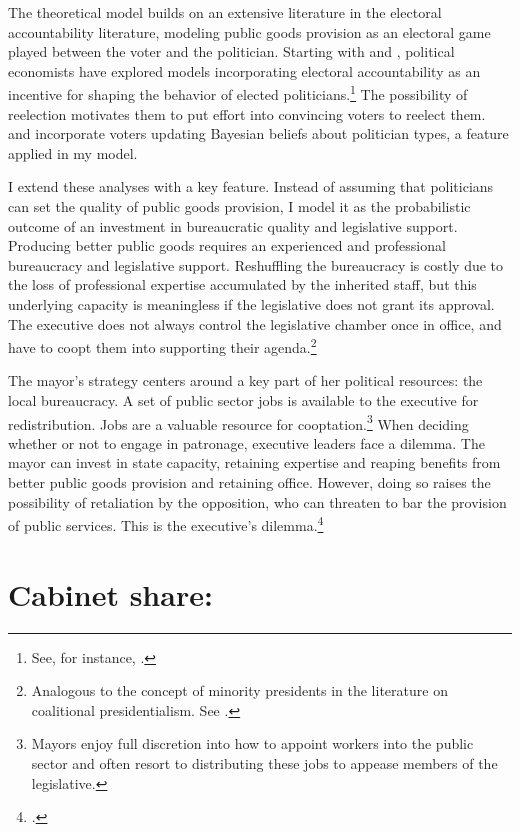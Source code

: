 \documentclass[12pt,]{book}
\let\rmarkdownfootnote\footnote%
\def\footnote{\protect\rmarkdownfootnote}
\begin{document}
The theoretical model builds on an extensive literature in the electoral accountability literature, modeling public goods provision as an electoral game played between the voter and the politician. Starting with \citet{barro_control_1973} and \citet{ferejohn_incumbent_1986}, political economists have explored models incorporating electoral accountability as an incentive for shaping the behavior of elected politicians.\footnote{See, for instance, \citet{ferraz_electoral_2011}.} The possibility of reelection motivates them to put effort into convincing voters to reelect them. \citet{coate_form_1995} and \citet{besley_principled_2006} incorporate voters updating Bayesian beliefs about politician types, a feature applied in my model.

I extend these analyses with a key feature. Instead of assuming that politicians can set the quality of public goods provision, I model it as the probabilistic outcome of an investment in bureaucratic quality and legislative support. Producing better public goods requires an experienced and professional bureaucracy and legislative support. Reshuffling the bureaucracy is costly due to the loss of professional expertise accumulated by the inherited staff, but this underlying capacity is meaningless if the legislative does not grant its approval. The executive does not always control the legislative chamber once in office, and have to coopt them into supporting their agenda.\footnote{Analogous to the concept of minority presidents in the literature on coalitional presidentialism. See \citet{figueiredo_presidential_2000}.}

The mayor's strategy centers around a key part of her political resources: the local bureaucracy. A set of public sector jobs is available to the executive for redistribution. Jobs are a valuable resource for cooptation.\footnote{Mayors enjoy full discretion into how to appoint workers into the public sector and often resort to distributing these jobs to appease members of the legislative.} When deciding whether or not to engage in patronage, executive leaders face a dilemma. The mayor can invest in state capacity, retaining expertise and reaping benefits from better public goods provision and retaining office. However, doing so raises the possibility of retaliation by the opposition, who can threaten to bar the provision of public services. This is the executive's dilemma.\footnote{\citet{geddes_politicians_1994}.}

\hypertarget{cabinet-share}{%
\section{Cabinet share:}\label{cabinet-share}}
\end{document}
